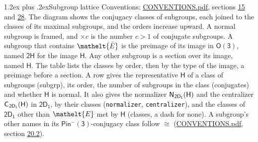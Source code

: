 \documentclass[10pt,a4paper]{article}
\makeatletter
\renewcommand\section{\@startsection{section}{1}{\z@}{-3ex plus -1ex minus -.2ex}%
  {1.2ex plus .2ex}{\normalfont\large\sffamily\bfseries\color{parttitle}}}
\numberwithin{equation}{section}
\newcommand{\eltfont}[1]{{\let\sigma\eltsigma\mathelt{#1}}}
\newcommand{\grp}[1]{\mathsf{#1}}
\newcommand{\cls}[1]{\eltfont{#1}}
\newcommand{\elt}[1]{\eltfont{#1}}
\newcommand{\samecls}{\cong}
\newcommand{\barred}[1]{\bar{#1}}
\newcommand{\hairsp}{\mkern1mu}
\makeatother
\begin{document}
\section{Subgroup lattice}\label{s:subgroups}
Conventions: \href{../../CONVENTIONS.pdf}{CONVENTIONS.pdf}, sections \href{../../../rotation/CONVENTIONS.pdf\#conv.15}{15} and \href{../../CONVENTIONS.pdf\#conv.28}{28}.
The diagram shows the conjugacy classes of subgroups, each joined to the classes of its maximal subgroups, and the orders increase upward. \label{n:index.conjugates.c}A normal subgroup is framed, and ${\times}c$ is the number $c > 1$ of conjugate subgroups. \label{n:group.H}A subgroup that contains $\elt{\barred{E}}$ is the preimage of its image in $\grp{O(3)}$, named $\grp{2H}$ for the image $\grp{H}$. Any other subgroup is a section over its image, named $\grp{H}$. The table lists the classes by order, then by the type of the image, a preimage before a section. \label{n:head.subgroup}\label{n:head.order}\label{n:head.conjugates}\label{n:head.normal}A row gives the representative $\grp{H}$ of a class of subgroups (subgrp), its order, the number of subgroups in the class (conjugates) and whether $\grp{H}$ is normal. \label{n:group.normalizer}\label{n:group.centralizer}\label{n:head.classes}It also gives the normalizer $\grp{N}_{\hairsp \grp{2D_{1}}}(\grp{H})$ and the centralizer $\grp{C}_{\hairsp \grp{2D_{1}}}(\grp{H})$ in $\grp{2D_{1}}$, by their classes (\texttt{normalizer}, \texttt{centralizer}), and the classes of $\grp{2D_{1}}$ other than $\cls{E}$ met by $\grp{H}$ (classes, a dash for none). A subgroup's other names in its \href{Pinminus3.pdf}{$\grp{Pin^{-}(3)}$}-conjugacy class follow $\samecls$ (\href{../../CONVENTIONS.pdf}{CONVENTIONS.pdf}, section \href{../../CONVENTIONS.pdf\#conv.20.2}{20.2}).
\begin{center}
\end{center}
\end{document}
